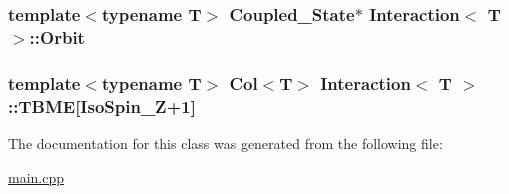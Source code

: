 \hypertarget{class_interaction_aafd4ee901de0d1463b71f89294b4b3f5}{
\subsubsection[{Orbit}]{\setlength{\rightskip}{0pt plus 5cm}template$<$typename T$>$ {\bf Coupled\-\_\-\-State}$\ast$ {\bf Interaction}$<$ T $>$\-::Orbit\hspace{0.3cm}{\ttfamily [private]}}}\label{class_interaction_aafd4ee901de0d1463b71f89294b4b3f5}
\hypertarget{class_interaction_ac7b745819fe9b13f3df3bd7750eceb97}{
\subsubsection[{T\-B\-M\-E}]{\setlength{\rightskip}{0pt plus 5cm}template$<$typename T$>$ Col$<$T$>$ {\bf Interaction}$<$ T $>$\-::T\-B\-M\-E\mbox{[}{\bf Iso\-Spin\-\_\-\-Z}+1\mbox{]}}}\label{class_interaction_ac7b745819fe9b13f3df3bd7750eceb97}


The documentation for this class was generated from the following file\-:\begin{DoxyCompactItemize}
\item 
\hyperlink{main_8cpp}{main.\-cpp}\end{DoxyCompactItemize}
